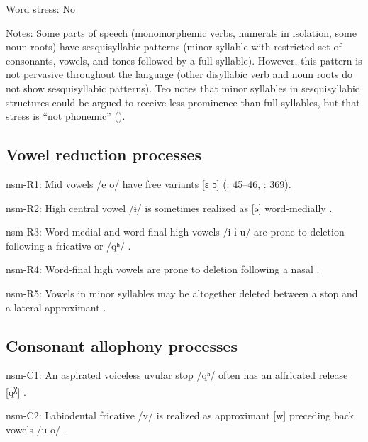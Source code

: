 {\begin{appendixdesc}
\item[Word stress:] No

\item[Notes:] Some parts of speech (monomorphemic verbs, numerals in isolation, some noun roots) have sesquisyllabic patterns  (minor syllable with restricted set of consonants, vowels, and tones followed by a full syllable). However, this pattern is not pervasive throughout the language (other disyllabic verb and noun roots do not show sesquisyllabic patterns). Teo notes that minor syllables in sesquisyllabic structures could be argued to receive less prominence than full syllables, but that stress is “not phonemic” (\citeyear[371--372]{Teo2012}).
\end{appendixdesc}
\subsection*{Vowel reduction processes}
\begin{appendixdesc}

\item[nsm-R1:] Mid vowels /e o/ have free variants [ɛ ɔ] (\citealt{Teo2009}: 45--46, \citealt{Teo2012}: 369).

\item[nsm-R2:] High central vowel /ɨ/ is sometimes realized as [ə] word-medially \citep[45]{Teo2009}.

\item[nsm-R3:] Word-medial and word-final high vowels /i ɨ u/ are prone to deletion following a fricative or /qʰ/ \citep[66]{Teo2009}.

\item[nsm-R4:] Word-final high vowels are prone to deletion following a nasal \citep[369]{Teo2012}.

\item[nsm-R5:] Vowels in minor syllables may be altogether deleted between a stop and a lateral approximant \citep[370]{Teo2012}.
\end{appendixdesc}
\subsection*{Consonant allophony processes}
\begin{appendixdesc}

\item[nsm-C1:] An aspirated voiceless uvular stop /qʰ/ often has an affricated release [q\textsuperscript{χ}] \citep[39]{Teo2009}.

\item[nsm-C2:] Labiodental fricative /v/ is realized as approximant [w] preceding back vowels /u o/ \citep[39]{Teo2009}.


\end{appendixdesc}}
